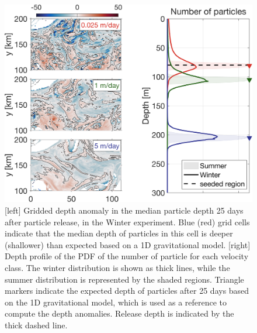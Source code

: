 \documentclass[draft,linenumbers]{agujournal2018}
\begin{document}
\begin{figure}[ht]
	\centering
	\includegraphics[width = 1\linewidth]{figures/Fig6.png}
	\caption{[left] Gridded depth anomaly in the median particle depth 25 days after particle release, in the Winter experiment. Blue (red) grid cells indicate that the median depth of particles in this cell is deeper (shallower) than expected based on a 1D gravitational model. [right]  Depth profile of the PDF of the number of particle for each velocity class. The winter distribution is shown as thick lines, while the summer distribution is represented by the shaded regions. Triangle markers indicate the expected depth of particles after 25 days based on the 1D gravitational model, which is used as a reference to compute the depth anomalies. Release depth is indicated by the thick dashed line.}	
	\label{fig: particle_export}
\end{figure}
\end{document}
